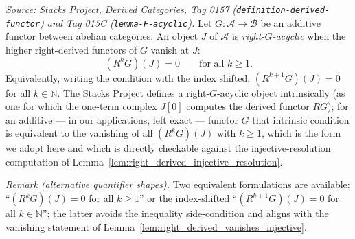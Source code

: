 \begin{definition}
  \label{def:right_acyclic}
  \textit{Source: Stacks Project, Derived Categories, Tag 0157
  (\texttt{definition-derived-functor}) and Tag 015C
  (\texttt{lemma-F-acyclic}).}
  Let \(G : \mathcal{A} \to \mathcal{B}\) be an additive functor between abelian
  categories. An object \(J\) of \(\mathcal{A}\) is \emph{right-\(G\)-acyclic} when
  the higher right-derived functors of \(G\) vanish at \(J\):
  \[
    (R^k G)(J) = 0 \qquad \text{for all } k \geq 1.
  \]
  Equivalently, writing the condition with the index shifted, \((R^{k+1} G)(J) = 0\)
  for all \(k \in \mathbb{N}\). The Stacks Project defines a right-\(G\)-acyclic
  object intrinsically (as one for which the one-term complex \(J[0]\) computes the
  derived functor \(RG\)); for an additive --- in our applications, left exact ---
  functor \(G\) that intrinsic condition is equivalent to the vanishing of all
  \((R^k G)(J)\) with \(k \geq 1\), which is the form we adopt here and which is
  directly checkable against the injective-resolution computation of
  Lemma~\ref{lem:right_derived_injective_resolution}.

  \emph{Remark (alternative quantifier shapes).} Two equivalent formulations are
  available: ``\((R^k G)(J) = 0\) for all \(k \geq 1\)'' or the index-shifted
  ``\((R^{k+1} G)(J) = 0\) for all \(k \in \mathbb{N}\)''; the latter avoids the
  inequality side-condition and aligns with the vanishing statement of
  Lemma~\ref{lem:right_derived_vanishes_injective}.
\end{definition}

